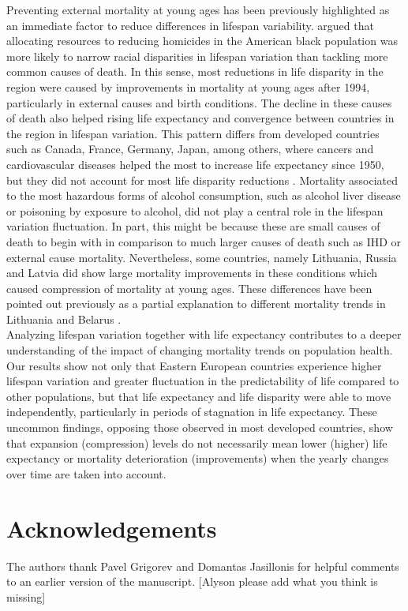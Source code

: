 \documentclass{article}
\begin{document}
\begin{spacing}{1.5}
Preventing external mortality at young ages has been previously highlighted as an immediate factor to reduce differences in lifespan variability. \citet{firebaugh2014lifespans} argued that allocating resources to reducing homicides in the American black population was more likely to narrow racial disparities in lifespan variation than tackling more common causes of death. In this sense, most reductions in life disparity in the region were caused by improvements in mortality at young ages after 1994, particularly in external causes and birth conditions. The decline in these causes of death also helped rising life expectancy and convergence between countries in the region in lifespan variation. This pattern differs from developed countries such as Canada, France, Germany, Japan, among others, where cancers and cardiovascular diseases helped the most to increase life expectancy since 1950, but they did not account for most life disparity reductions \citep{seligman2016equity}.
Mortality associated to the most hazardous forms of alcohol consumption, such as alcohol liver disease or poisoning by exposure to alcohol, did not play a central role in the lifespan variation fluctuation. In part, this might be because these are small causes of death to begin with in comparison to much larger causes of death such as IHD or external cause mortality. Nevertheless, some countries, namely Lithuania, Russia and Latvia did show large mortality improvements in these conditions which caused compression of mortality at young ages. These differences have been pointed out previously as a partial explanation to different mortality trends in Lithuania and Belarus \citep{grigoriev2015spatial}.\\

Analyzing lifespan variation together with life expectancy contributes to a deeper understanding of the impact of changing mortality trends on population health. Our results show not only that Eastern European countries experience higher lifespan variation and greater fluctuation in the predictability of life compared to other populations, but that life expectancy and life disparity were able to move independently, particularly in periods of stagnation in life expectancy. These uncommon findings, opposing those observed in most developed countries, show that expansion (compression) levels do not necessarily mean lower (higher) life expectancy  or mortality deterioration (improvements) when the yearly changes over time are taken into account. 

\section*{Acknowledgements}
The authors thank Pavel Grigorev and Domantas Jasillonis for helpful comments to an earlier version of the manuscript. [Alyson please add what you think is missing]


\end{spacing}
\end{document}
